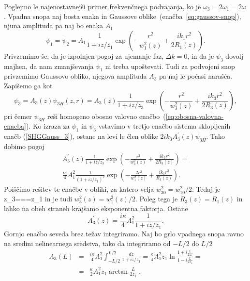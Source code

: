 Poglejmo le najenostavnejši primer frekvenčnega podvajanja, ko je 
$\omega_{3}=2\omega_{1}=2\omega$.
Vpadna snopa naj bosta enaka in Gaussove oblike~(enačba~\ref{eq:gaussov-snop}), 
njuna amplituda pa naj bo enaka $A_1$
\begin{equation}
\psi_{1} = \psi_2 = A_{1}\frac{1}{1+iz/z_1}
\exp\left(-\frac{r^{2}}{w_1^{2}(z)}+\frac{ik_1r^{2}}{2R_1(z)}\right).
\label{8.21}
\end{equation}
Privzemimo še, da je izpolnjen pogoj za ujemanje faz, $\Delta k=0$,
in da je $\psi_{3}$ dovolj majhen, da nam zmanjševanja $\psi_{1}$
ni treba upoštevati. Tudi za podvojeni snop privzemimo Gaussovo 
obliko, njegova amplituda $A_3$ pa naj le počasi narašča. Zapišemo ga kot
\begin{equation}
\psi_{3}=A_{3}(z)\psi_{3H}(z,r)=A_{3}(z)\frac{1}{1+iz/z_{3}}
\exp\left(-\frac{r^{2}}{w_{3}^{2}(z)}+\frac{ik_{3}r^{2}}{2R_{3}(z)}\right),
\label{8.22}
\end{equation}
pri čemer $\psi_{3H}$ reši homogeno obosno valovno 
enačbo~(\ref{eq:obosna-valovna-enacba}). Ko izraza za $\psi_{1}$
in $\psi_{3}$ vstavimo v tretjo enačbo sistema sklopljenih enačb (\ref{SHGGauss_3}),
ostane na levi le člen oblike $2ik_{3}A_{3}^{\prime}(z)\psi_{3H}$. Tako dobimo pogoj
\begin{equation}
\begin{aligned}
A_{3}^{\prime}(z)\frac{1}{1+iz/z_3}\exp\left(-\frac{r^{2}}{w_{3}^{2}(z)}+\frac{ik_{3}r^{2}}
{2R_{3}(z)}\right)=\\
\frac{i\kappa}{4}A_{1}^{2}\frac{1}{(1+iz/z_{1})^{2}}\exp\left(-\frac{2r^{2}}
{w_{1}^{2}(z)}+\frac{ik_{1}r^{2}}{R_{1}(z)}\right).
\label{8.23}
\end{aligned}
\end{equation}
Poiščimo rešitev te enačbe v obliki, za katero velja $w_{30}^{2}=w_{10}^{2}/2$. Tedaj je 
\beq
z_{3}===z_{1}
\eeq
in je tudi $w_{3}^{2}(z)=w_{1}^{2}(z)/2$. Poleg tega je $R_{3}(z)=R_{1}(z)$
in lahko na obeh straneh krajšamo eksponentna faktorja. Ostane 
\begin{equation}
A_{3}^{\prime}(z)=\frac{i\kappa}{4}A_{1}^{2}\frac{1}{1+iz/z_1}.
\label{8.24}
\end{equation}
Gornjo enačbo seveda brez težav integriramo. Naj bo grlo vpadnega
snopa ravno na sredini nelinearnega sredstva, tako da integriramo
od $-L/2$ do $L/2$
\begin{eqnarray}
A_{3}(L) & = & \frac{i\kappa}{4}A_{1}^{2}\int_{-L/2}^{L/2}\frac{dz}{1+iz/z_1} 
  = \frac{\kappa}{4}A_{1}^{2}z_{1}\ln\frac{1+i\frac{L}{2z_{1}}}{1-i\frac{L}{2z_{1}}}= \nonumber \\
 & = & \frac{\kappa}{2}A_{1}^{2}z_{1}\arctan\frac{L}{2z_{1}}\;.
\end{eqnarray}
